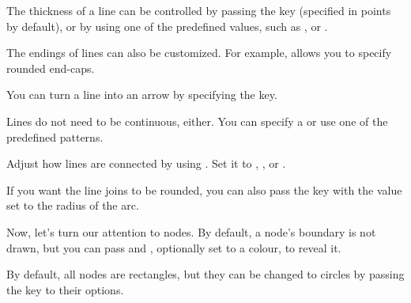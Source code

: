 The thickness of a line can be controlled by passing the  key
(specified in points by default), or by using one of the predefined values, such
as ,  or .
\begin{example}
\end{example}

The endings of lines can also be customized. For
example,  allows you to specify rounded
end-caps.
\begin{example}
\end{example}
You can turn a line into an arrow by specifying the  key.
\begin{example}
\end{example}

Lines do not need to be continuous, either. You can specify a  or use one of the predefined patterns.
\begin{example}
\end{example}

Adjust how lines are connected by using
. Set it to , , or
.
\begin{example}
\end{example}
If you want the line joins to be rounded, you can also pass the  key with the value set to the radius of the arc.
\begin{example}
\end{example}

Now, let's turn our attention to nodes. By default, a node's boundary is not
drawn, but you can pass  and , optionally set to a
colour, to reveal it.
\begin{example}
\end{example}
By default, all nodes are rectangles, but they can be changed to circles by
passing the  key to their options.
\begin{example}
\end{example}

